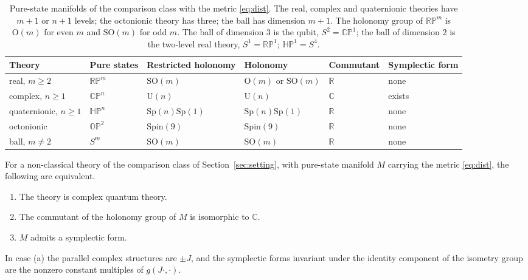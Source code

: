\begin{table}[ht]\centering\footnotesize\setlength{\tabcolsep}{3.5pt}
\begin{tabular}{@{}llllll@{}}\toprule
Theory & Pure states & Restricted holonomy & Holonomy & Commutant & Symplectic form\\\midrule
real, $m\ge2$ & $\mathbb{RP}^m$ & $\mathrm{SO}(m)$ & $\mathrm{O}(m)$ or $\mathrm{SO}(m)$ & $\mathbb{R}$ & none\\
complex, $n\ge1$ & $\mathbb{CP}^n$ & $\mathrm{U}(n)$ & $\mathrm{U}(n)$ & $\mathbb{C}$ & exists\\
quaternionic, $n\ge1$ & $\mathbb{HP}^n$ & $\mathrm{Sp}(n)\mathrm{Sp}(1)$ & $\mathrm{Sp}(n)\mathrm{Sp}(1)$ & $\mathbb{R}$ & none\\
octonionic & $\mathbb{OP}^2$ & $\mathrm{Spin}(9)$ & $\mathrm{Spin}(9)$ & $\mathbb{R}$ & none\\
ball, $m\ne2$ & $S^m$ & $\mathrm{SO}(m)$ & $\mathrm{SO}(m)$ & $\mathbb{R}$ & none\\\bottomrule
\end{tabular}
\caption{Pure-state manifolds of the comparison class with the metric \eqref{eq:dist}. The real, complex and quaternionic theories have $m+1$ or $n+1$ levels; the octonionic theory has three; the ball has dimension $m+1$. The holonomy group of $\mathbb{RP}^m$ is $\mathrm{O}(m)$ for even $m$ and $\mathrm{SO}(m)$ for odd $m$. The ball of dimension $3$ is the qubit, $S^2=\mathbb{CP}^1$; the ball of dimension $2$ is the two-level real theory, $S^1=\mathbb{RP}^1$; $\mathbb{HP}^1=S^4$.}\label{tab:disc}
\end{table}

\begin{theorem}\label{thm:disc}
For a non-classical theory of the comparison class of Section~\ref{sec:setting}, with pure-state manifold $M$ carrying the metric \eqref{eq:dist}, the following are equivalent.
\begin{enumerate}[label=(\alph*)]
\item The theory is complex quantum theory.
\item The commutant of the holonomy group of $M$ is isomorphic to $\mathbb{C}$.
\item $M$ admits a symplectic form.
\end{enumerate}
In case (a) the parallel complex structures are $\pm J$, and the symplectic forms invariant under the identity component of the isometry group are the nonzero constant multiples of $g(J\cdot,\cdot)$.
\end{theorem}

